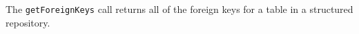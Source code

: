 The \verb+getForeignKeys+ call returns all of the foreign keys for a table in a structured repository.

